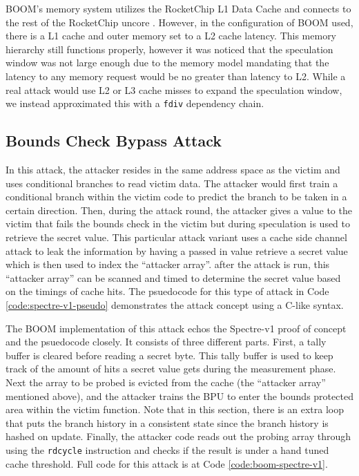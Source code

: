 
BOOM's memory system utilizes the RocketChip L1 Data Cache and connects to the rest of the RocketChip
uncore \cite{b54}. However, in the configuration of BOOM used, there is a L1 cache and outer memory set to a L2 cache
latency. This memory hierarchy still functions properly, however it was noticed that the speculation window
was not large enough due to the memory model mandating that the latency to any memory request would be no greater than latency to L2.
While a real attack would use L2 or L3 cache misses to expand the speculation window, we instead approximated this with a {\tt fdiv} dependency chain.

\subsection{Bounds Check Bypass Attack} \label{Bounds Check Bypass Attack}

In this attack, the attacker resides in the same address space as the victim and uses
conditional branches to read victim data. The attacker would first train a conditional branch
within the victim code to predict the branch to be taken in a certain direction. Then,
during the attack round, the attacker
gives a value to the victim that fails the bounds check in the victim but during
speculation is used to retrieve the secret value. This particular attack variant
uses a cache side channel attack to leak the information by having a passed in value retrieve
a secret value which is then used to index the ``attacker array''. after the attack is run, this 
``attacker array'' can be scanned and timed to determine the secret value based on the timings
of cache hits. The psuedocode for this type of attack in Code \ref{code:spectre-v1-pseudo}
demonstrates the attack concept using a C-like syntax.


The BOOM implementation of this attack echos the Spectre-v1 proof of concept and the psuedocode closely.
It consists of three different parts. First, a tally buffer is cleared before reading a secret byte.
This tally buffer is used to keep track of the amount of hits a secret value gets during the measurement
phase. Next the array to be probed is evicted from the cache (the ``attacker array'' mentioned above), and
the attacker trains the BPU to enter the bounds protected area within the victim function. Note that in
this section, there is an extra loop that puts the branch history in a consistent state since the branch
history is hashed on update. Finally, the attacker code reads out the probing array through using the
{\tt rdcycle} instruction and checks if the result is under a hand tuned cache threshold. Full code for 
this attack is at Code \ref{code:boom-spectre-v1}.

